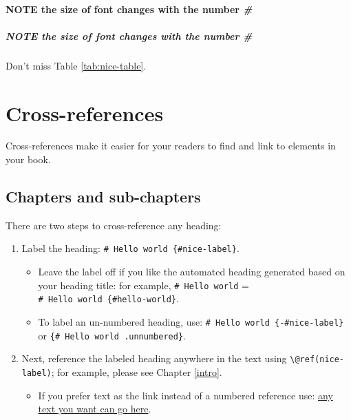 \documentclass[
]{book}
\providecommand{\tightlist}{%
  \setlength{\itemsep}{0pt}\setlength{\parskip}{0pt}}
\theoremstyle{definition}
\theoremstyle{definition}
\theoremstyle{definition}
\theoremstyle{definition}
\theoremstyle{remark}
\begin{document}
\hypertarget{note-the-size-of-font-changes-with-the-number-2}{%
\subsubsection{\texorpdfstring{NOTE the size of font changes with the number \emph{\#}}{NOTE the size of font changes with the number \#}}\label{note-the-size-of-font-changes-with-the-number-2}}

\hypertarget{note-the-size-of-font-changes-with-the-number-3}{%
\paragraph{\texorpdfstring{NOTE the size of font changes with the number \emph{\#}}{NOTE the size of font changes with the number \#}}\label{note-the-size-of-font-changes-with-the-number-3}}

Don't miss Table \ref{tab:nice-table}.

\hypertarget{cross}{%
\chapter{Cross-references}\label{cross}}

Cross-references make it easier for your readers to find and link to elements in your book.

\hypertarget{chapters-and-sub-chapters}{%
\section{Chapters and sub-chapters}\label{chapters-and-sub-chapters}}

There are two steps to cross-reference any heading:

\begin{enumerate}
\def\labelenumi{\arabic{enumi}.}
\item
  Label the heading: \texttt{\#\ Hello\ world\ \{\#nice-label\}}.

  \begin{itemize}
  \item
    Leave the label off if you like the automated heading generated based on your heading title: for example, \texttt{\#\ Hello\ world} = \texttt{\#\ Hello\ world\ \{\#hello-world\}}.
  \item
    To label an un-numbered heading, use: \texttt{\#\ Hello\ world\ \{-\#nice-label\}} or \texttt{\{\#\ Hello\ world\ .unnumbered\}}.
  \end{itemize}
\item
  Next, reference the labeled heading anywhere in the text using \texttt{\textbackslash{}@ref(nice-label)}; for example, please see Chapter \ref{intro}.

  \begin{itemize}
  \tightlist
  \item
    If you prefer text as the link instead of a numbered reference use: \protect\hyperlink{cross}{any text you want can go here}.
  \end{itemize}
\end{enumerate}
\end{document}
